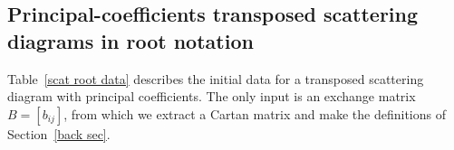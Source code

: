 \documentclass[ALCO,ThmDefs,Unicode,epreuves]{cedram}
\DeclareMathOperator{\uf}{uf}
\newcommand\llbracket{[\![}
\newcommand\rrbracket{]\!]}
\newcommand{\integers}{\mathbb Z}
\newcommand{\set}[1]{{\left\lbrace #1 \right\rbrace}}
\newcommand{\m}{\mathbf{m}}
\renewcommand{\k}{\Bbbk}
\newcommand{\hy}{\hat{y}}
\begin{document}
\subsection{Principal-coefficients transposed scattering diagrams in root notation}\label{prin trans sec}
Table~\ref{scat root data} describes the initial data for a transposed scattering diagram with principal coefficients.
The only input is an exchange matrix $B=[b_{ij}]$, from which we extract a Cartan matrix and make the definitions of Section~\ref{back sec}.
\end{document}
